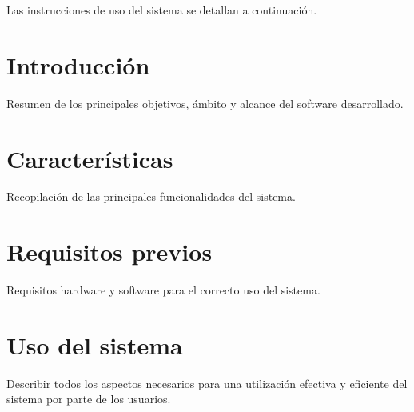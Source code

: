 

Las instrucciones de uso del sistema se detallan a continuación.

\section{Introducción}
Resumen de los principales objetivos, ámbito y alcance del software desarrollado.

\section{Características}
Recopilación de las principales funcionalidades del sistema.

\section{Requisitos previos}
Requisitos hardware y software para el correcto uso del sistema.

\section{Uso del sistema}
Describir todos los aspectos necesarios para una utilización efectiva y eficiente del sistema por parte de los usuarios.




